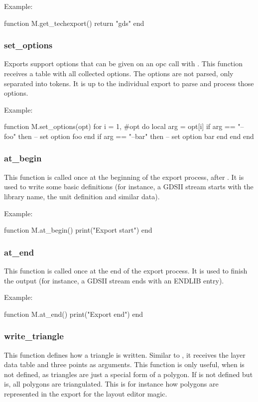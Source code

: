 Example:
\begin{lualisting}
    function M.get_techexport()
        return "gds"
    end
\end{lualisting}

\subsubsection{set\_options}
Exports support options that can be given on an opc call with .
This function receives a table with all collected options.
The options are not parsed, only separated into tokens.
It is up to the individual export to parse and process those options.

Example:
\begin{lualisting}
    function M.set_options(opt)
        for i = 1, #opt do
            local arg = opt[i]
            if arg == "--foo" then
                -- set option foo
            end
            if arg == "--bar" then
                -- set option bar
            end
        end
    end
\end{lualisting}

\subsubsection{at\_begin}
This function is called once at the beginning of the export process, after .
It is used to write some basic definitions (for instance, a GDSII stream starts with the library name, the unit definition and similar data).

Example:
\begin{lualisting}
    function M.at_begin()
        print("Export start")
    end
\end{lualisting}

\subsubsection{at\_end}
This function is called once at the end of the export process.
It is used to finish the output (for instance, a GDSII stream ends with an ENDLIB entry).

Example:
\begin{lualisting}
    function M.at_end()
        print("Export end")
    end
\end{lualisting}

\subsubsection{write\_triangle}
This function defines how a triangle is written.
Similar to , it receives the layer data table and three points as arguments.
This function is only useful, when  is not defined, as triangles are just a special form of a polygon.
If  is not defined but  is, all polygons are triangulated.
This is for instance how polygons are represented in the export for the layout editor magic.

